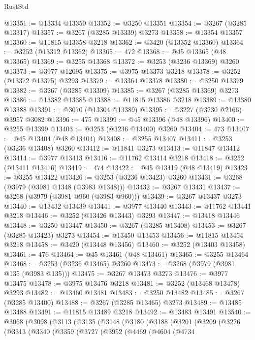 \begin{lexlean}{RustStd}
\begin{coremodule}
{\begin{coremodule}
{{{{{{{{{{{{{{{{{{{{{{{{{{{{{{{{{{{{{{{@13351 := @13334 @13350
@13352 := @3250 @13351
@13354 := @3267 (@3285 @13317)
@13357 := @3267 (@3285 @13339) @3273
@13358 := @13354 @13357
@13360 := @11815 @13358 @3218
@13362 := @3420 (@13352 @13360)
@13364 := @3252 (@13312 @13362)
@13365 := 472
@13368 := @45 @13365 (@48 @13365)
@13369 := @3255 @13368
@13372 := @3253 (@3236 @13369) @3260
@13373 := @3977 @12095
@13375 := @3975 @13373 @3218
@13378 := @3252 (@13372 @13375) @3293
@13379 := @13364 @13378
@13380 := @3250 @13379
@13382 := @3267 (@3285 @13309)
@13385 := @3267 (@3285 @13369) @3273
@13386 := @13382 @13385
@13388 := @11815 @13386 @3218
@13389 := @13380 @13388
@13391 := @3070 (@13304 @13389)
@13395 := @3227 (@3230 @2166) @3957 @3082
@13396 := 475
@13399 := @45 @13396 (@48 @13396)
@13400 := @3255 @13399
@13403 := @3253 (@3236 @13400) @3260
@13404 := 473
@13407 := @45 @13404 (@48 @13404)
@13408 := @3255 @13407
@13411 := @3253 (@3236 @13408) @3260
@13412 := @11841 @3273
@13413 := @11847 @13412
@13414 := @3977 @13413
@13416 := @11762 @13414 @3218
@13418 := @3252 (@13411 @13416)
@13419 := 474
@13422 := @45 @13419 (@48 @13419)
@13423 := @3255 @13422
@13426 := @3253 (@3236 @13423) @3260
@13431 := @3268 (@3979 (@3981 @1348 (@3983 @1348)))
@13432 := @3267 @13431
@13437 := @3268 (@3979 (@3981 @960 (@3983 @960)))
@13439 := @3267 @13437 @3273
@13440 := @13432 @13439
@13441 := @3977 @13440
@13443 := @11762 @13441 @3218
@13446 := @3252 (@13426 @13443) @3293
@13447 := @13418 @13446
@13448 := @3250 @13447
@13450 := @3267 (@3285 @13408)
@13453 := @3267 (@3285 @13423) @3273
@13454 := @13450 @13453
@13456 := @11815 @13454 @3218
@13458 := @3420 (@13448 @13456)
@13460 := @3252 (@13403 @13458)
@13461 := 476
@13464 := @45 @13461 (@48 @13461)
@13465 := @3255 @13464
@13468 := @3253 (@3236 @13465) @3260
@13473 := @3268 (@3979 (@3981 @135 (@3983 @135)))
@13475 := @3267 @13473 @3273
@13476 := @3977 @13475
@13478 := @3975 @13476 @3218
@13481 := @3252 (@13468 @13478) @3293
@13482 := @13460 @13481
@13483 := @3250 @13482
@13485 := @3267 (@3285 @13400)
@13488 := @3267 (@3285 @13465) @3273
@13489 := @13485 @13488
@13491 := @11815 @13489 @3218
@13492 := @13483 @13491
@13540 := @3068
    (@3098
      (@3113
        (@3135
          (@3148
            (@3180
              (@3188
                (@3201
                  (@3209
                    (@3226
                      (@3313
                        (@3340
                          (@3359
                            (@3727
                              (@3952
                                (@4469
                                  (@4604
                                    (@4734
}}}}}}}}}}}}}}}}}}}}}}}}}}}}}}}}}}}}}}}
\end{coremodule}}
\end{coremodule}
\end{lexlean}
